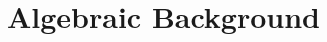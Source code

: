 








\begin{Preface}

%
%
%
%
%
%


%
%


\tableofcontents

\end{Preface}


\pagestyle{fancyplain}




%
%

\chapter{Algebraic Background} 
\label{chap:algbackground} 
\singlespacing


